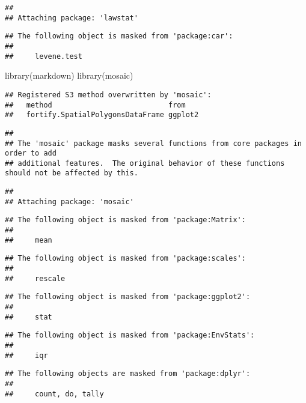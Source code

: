 \documentclass[
]{article}
\newenvironment{Shaded}{\begin{snugshade}}{\end{snugshade}}
\newcommand{\FunctionTok}[1]{\textcolor[rgb]{0.00,0.00,0.00}{#1}}
\newcommand{\NormalTok}[1]{#1}
\begin{document}
\begin{verbatim}
## 
## Attaching package: 'lawstat'
\end{verbatim}

\begin{verbatim}
## The following object is masked from 'package:car':
## 
##     levene.test
\end{verbatim}

\begin{Shaded}
\begin{Highlighting}[]
\FunctionTok{library}\NormalTok{(markdown)}
\FunctionTok{library}\NormalTok{(mosaic)}
\end{Highlighting}
\end{Shaded}

\begin{verbatim}
## Registered S3 method overwritten by 'mosaic':
##   method                           from   
##   fortify.SpatialPolygonsDataFrame ggplot2
\end{verbatim}

\begin{verbatim}
## 
## The 'mosaic' package masks several functions from core packages in order to add 
## additional features.  The original behavior of these functions should not be affected by this.
\end{verbatim}

\begin{verbatim}
## 
## Attaching package: 'mosaic'
\end{verbatim}

\begin{verbatim}
## The following object is masked from 'package:Matrix':
## 
##     mean
\end{verbatim}

\begin{verbatim}
## The following object is masked from 'package:scales':
## 
##     rescale
\end{verbatim}

\begin{verbatim}
## The following object is masked from 'package:ggplot2':
## 
##     stat
\end{verbatim}

\begin{verbatim}
## The following object is masked from 'package:EnvStats':
## 
##     iqr
\end{verbatim}

\begin{verbatim}
## The following objects are masked from 'package:dplyr':
## 
##     count, do, tally
\end{verbatim}
\end{document}
